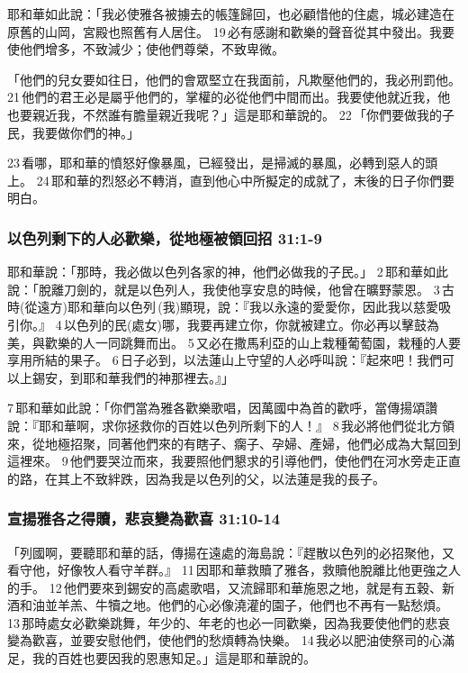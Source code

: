 耶和華如此說：「我必使雅各被擄去的帳篷歸回，也必顧惜他的住處，城必建造在原舊的山岡，宮殿也照舊有人居住。 19 必有感謝和歡樂的聲音從其中發出。我要使他們增多，不致減少；使他們尊榮，不致卑微。

「他們的兒女要如往日，他們的會眾堅立在我面前，凡欺壓他們的，我必刑罰他。 21 他們的君王必是屬乎他們的，掌權的必從他們中間而出。我要使他就近我，他也要親近我，不然誰有膽量親近我呢？」這是耶和華說的。 22 「你們要做我的子民，我要做你們的神。」

23 看哪，耶和華的憤怒好像暴風，已經發出，是掃滅的暴風，必轉到惡人的頭上。 24 耶和華的烈怒必不轉消，直到他心中所擬定的成就了，末後的日子你們要明白。

\subsubsection{以色列剩下的人必歡樂，從地極被領回招 31:1-9}
耶和華說：「那時，我必做以色列各家的神，他們必做我的子民。」 2 耶和華如此說：「脫離刀劍的，就是以色列人，我使他享安息的時候，他曾在曠野蒙恩。 3 古時(從遠方)耶和華向以色列 (我)顯現，說：『我以永遠的愛愛你，因此我以慈愛吸引你。』 4 以色列的民(處女)哪，我要再建立你，你就被建立。你必再以擊鼓為美，與歡樂的人一同跳舞而出。 5 又必在撒馬利亞的山上栽種葡萄園，栽種的人要享用所結的果子。 6 日子必到，以法蓮山上守望的人必呼叫說：『起來吧！我們可以上錫安，到耶和華我們的神那裡去。』」

7 耶和華如此說：「你們當為雅各歡樂歌唱，因萬國中為首的歡呼，當傳揚頌讚說：『耶和華啊，求你拯救你的百姓以色列所剩下的人！』 8 我必將他們從北方領來，從地極招聚，同著他們來的有瞎子、瘸子、孕婦、產婦，他們必成為大幫回到這裡來。 9 他們要哭泣而來，我要照他們懇求的引導他們，使他們在河水旁走正直的路，在其上不致絆跌，因為我是以色列的父，以法蓮是我的長子。

\subsubsection{宣揚雅各之得贖，悲哀變為歡喜 31:10-14}
「列國啊，要聽耶和華的話，傳揚在遠處的海島說：『趕散以色列的必招聚他，又看守他，好像牧人看守羊群。』 11 因耶和華救贖了雅各，救贖他脫離比他更強之人的手。 12 他們要來到錫安的高處歌唱，又流歸耶和華施恩之地，就是有五穀、新酒和油並羊羔、牛犢之地。他們的心必像澆灌的園子，他們也不再有一點愁煩。 13 那時處女必歡樂跳舞，年少的、年老的也必一同歡樂，因為我要使他們的悲哀變為歡喜，並要安慰他們，使他們的愁煩轉為快樂。 14 我必以肥油使祭司的心滿足，我的百姓也要因我的恩惠知足。」這是耶和華說的。

